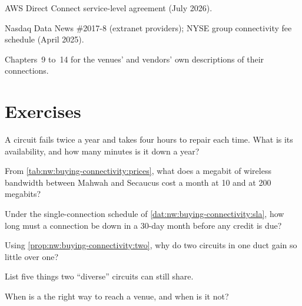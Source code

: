 \begin{omsources}
\item AWS Direct Connect service-level agreement (July 2026).
\item Nasdaq Data News \#2017-8 (extranet providers); NYSE group connectivity fee schedule (April 2025).
\item Chapters~9 to~14 for the venues' and vendors' own descriptions of their connections.
\end{omsources}

\section{Exercises}

\begin{exercise}[$\star$]\label{exo:nw:buying-connectivity:1}
A circuit fails twice a year and takes four hours to repair each time. What is its availability, and how many minutes is it down a year?
\end{exercise}

\begin{exercise}[$\star$]\label{exo:nw:buying-connectivity:2}
From \cref{tab:nw:buying-connectivity:prices}, what does a megabit of wireless bandwidth between Mahwah and Secaucus cost a month at 10 and at 200
megabits?
\end{exercise}

\begin{exercise}[$\star$]\label{exo:nw:buying-connectivity:3}
Under the single-connection schedule of \cref{dat:nw:buying-connectivity:sla}, how long must a connection be down in a 30-day month before any credit
is due?
\end{exercise}

\begin{exercise}[$\star\star$]\label{exo:nw:buying-connectivity:4}
Using \cref{prop:nw:buying-connectivity:two}, why do two circuits in one duct gain so little over one?
\end{exercise}

\begin{exercise}[$\star\star$]\label{exo:nw:buying-connectivity:5}
List five things two ``diverse'' circuits can still share.
\end{exercise}

\begin{exercise}[$\star\star$]\label{exo:nw:buying-connectivity:6}
When is a  the right way to reach a venue, and when is it not?
\end{exercise}

